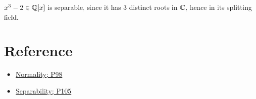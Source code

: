 \begin{example}{}{}
    $x^3-2\in\mathbb{Q}[x]$ is separable, since it has $3$ distinct roots in $\mathbb{C}$,
    hence in its splitting field.
\end{example}



\section{Reference}

\begin{itemize}
    \item \href{https://www.maths.ed.ac.uk/~tl/gt/gt.pdf}{Normality; P98}
    \item \href{https://www.maths.ed.ac.uk/~tl/gt/gt.pdf}{Separability; P105}
\end{itemize}
